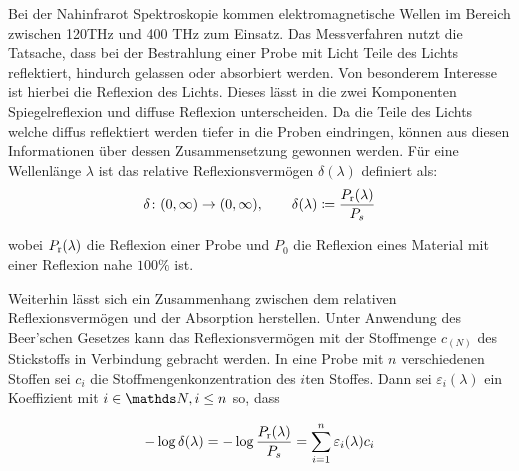 		Bei der Nahinfrarot Spektroskopie kommen elektromagnetische Wellen im Bereich zwischen 120THz und 400 THz zum Einsatz. \cite{Agelet2010}
		Das Messverfahren nutzt die Tatsache, dass bei der Bestrahlung einer Probe mit Licht Teile des Lichts reflektiert, hindurch gelassen oder absorbiert werden.
		Von besonderem Interesse ist hierbei die Reflexion des Lichts.
		Dieses lässt in die zwei Komponenten Spiegelreflexion und diffuse Reflexion unterscheiden.
		Da die Teile des Lichts welche diffus reflektiert werden tiefer in die Proben eindringen, können aus diesen Informationen über dessen Zusammensetzung gewonnen werden. 
		Für eine Wellenlänge $\lambda$ ist das relative Reflexionsvermögen $\delta(\lambda)$ definiert als:
		\[
			\delta\colon(0,\infty)\to(0,\infty),\qquad \delta(\lambda) \coloneqq \frac{P_{\mathrm{r}}(\lambda)}{P_s}
		\]
		
		wobei $P_{\mathrm{r}}(\lambda)$ die Reflexion einer Probe und $P_0$ die Reflexion eines Material mit einer Reflexion nahe $100\%$ ist.
		
		Weiterhin lässt sich ein Zusammenhang zwischen dem relativen Reflexionsvermögen und der Absorption herstellen.
		Unter Anwendung des Beer'schen Gesetzes kann das Reflexionsvermögen mit der Stoffmenge $c_{(N)}$ des Stickstoffs in Verbindung gebracht werden.
		In eine Probe mit $n$ verschiedenen Stoffen sei $c_i$ die Stoffmengenkonzentration des $i$ten Stoffes. Dann sei $\varepsilon_i(\lambda)$ ein Koeffizient mit $i\in\SN,i\leq n$ so, dass
		
		\[
			-\log \delta(\lambda) = -\log \frac{P_{\mathrm{r}}(\lambda)}{P_s} = \sum_{i=1}^{n} \varepsilon_i(\lambda) c_i
		\]



